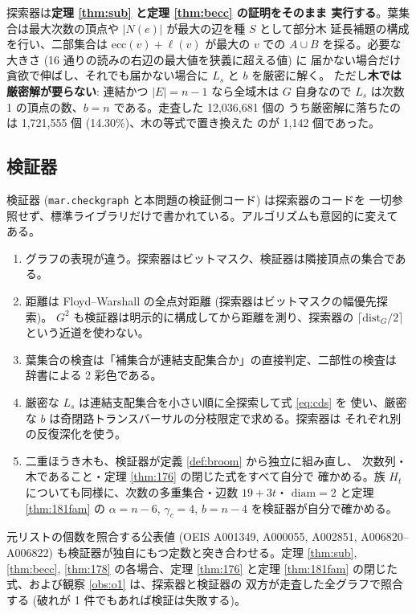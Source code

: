 \documentclass[paper=a4,fontsize=10.5pt,jafontsize=10.5pt]{jlreq}
\theoremstyle{plain}
\theoremstyle{definition}
\begin{document}
探索器は\textbf{定理 \ref{thm:sub} と定理 \ref{thm:becc} の証明をそのまま
実行する}。葉集合は最大次数の頂点や $|N(e)|$ が最大の辺を種 $S$ として部分木
延長補題の構成を行い、二部集合は $\mathrm{ecc}(v) + \ell(v)$ が最大の $v$ での
$A \cup B$ を採る。必要な大きさ (16 通りの読みの右辺の最大値を狭義に超える値) に
届かない場合だけ貪欲で伸ばし、それでも届かない場合に $L_s$ と $b$ を厳密に解く。
ただし\textbf{木では厳密解が要らない}: 連結かつ $|E| = n-1$ なら全域木は $G$
自身なので $L_s$ は次数 1 の頂点の数、$b = n$ である。走査した 12,036,681 個の
うち厳密解に落ちたのは 1,721,555 個 (14.30\%)、木の等式で置き換えた
のが 1,142 個であった。

\subsection{検証器}

検証器 (\texttt{mar.checkgraph} と本問題の検証側コード) は探索器のコードを
一切参照せず、標準ライブラリだけで書かれている。アルゴリズムも意図的に変えて
ある。

\begin{enumerate}
\item グラフの表現が違う。探索器はビットマスク、検証器は隣接頂点の集合である。
\item 距離は Floyd--Warshall の全点対距離 (探索器はビットマスクの幅優先探索)。
      $G^2$ も検証器は明示的に構成してから距離を測り、探索器の
      $\lceil \mathrm{dist}_G/2 \rceil$ という近道を使わない。
\item 葉集合の検査は「補集合が連結支配集合か」の直接判定、二部性の検査は
      辞書による 2 彩色である。
\item 厳密な $L_s$ は連結支配集合を小さい順に全探索して式 \eqref{eq:cds} を
      使い、厳密な $b$ は奇閉路トランスバーサルの分枝限定で求める。探索器は
      それぞれ別の反復深化を使う。
\item 二重ほうき木も、検証器が定義 \ref{def:broom} から独立に組み直し、
      次数列・木であること・定理 \ref{thm:176} の閉じた式をすべて自分で
      確かめる。族 $H_t$ についても同様に、次数の多重集合・辺数 $19 + 3t$・
      $\mathrm{diam} = 2$ と定理 \ref{thm:181fam} の
      $\alpha = n-6$, $\gamma_c = 4$, $b = n-4$ を検証器が自分で確かめる。
\end{enumerate}

元リストの個数を照合する公表値 (OEIS A001349, A000055, A002851,
A006820--A006822) も検証器が独自にもつ定数と突き合わせる。定理 \ref{thm:sub},
\ref{thm:becc}, \ref{thm:178} の各場合、定理 \ref{thm:176} と定理
\ref{thm:181fam} の閉じた式、および観察 \ref{obs:o1} は、探索器と検証器の
双方が走査した全グラフで照合する
(破れが 1 件でもあれば検証は失敗する)。
\end{document}
